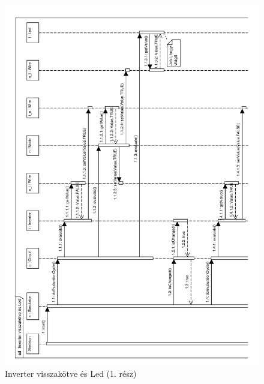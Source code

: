 \begin{figure}[H]
\begin{center}
\includegraphics[width=16.5cm]{chapters/chapter05/imgs/test4-1.pdf}
\caption{Inverter visszakötve és Led (1. rész)}
\label{fig:init}
\end{center}
\end{figure}


